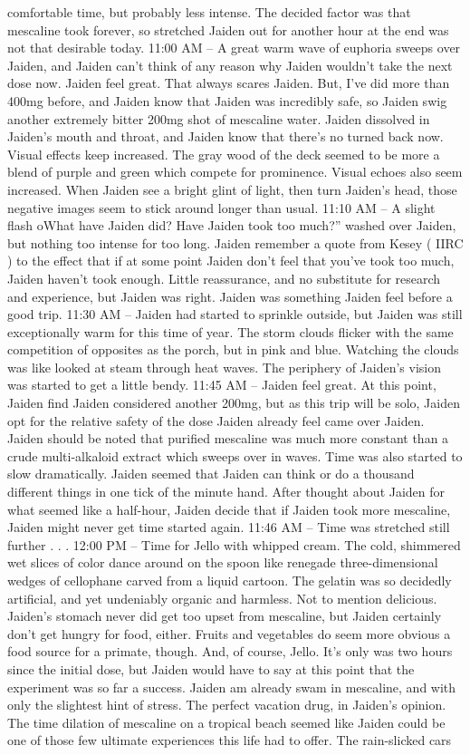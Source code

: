 \documentclass[12pt]{book}
\begin{document}
comfortable time, but probably less intense. The decided factor was that mescaline took forever, so stretched Jaiden out for another hour at the end was not that desirable today. 11:00 AM -- A great warm wave of euphoria sweeps over Jaiden, and Jaiden can't think of any reason why Jaiden wouldn't take the next dose now. Jaiden feel great. That always scares Jaiden. But, I've did more than 400mg before, and Jaiden know that Jaiden was incredibly safe, so Jaiden swig another extremely bitter 200mg shot of mescaline water. Jaiden dissolved in Jaiden's mouth and throat, and Jaiden know that there's no turned back now. Visual effects keep increased. The gray wood of the deck seemed to be more a blend of purple and green which compete for prominence. Visual echoes also seem increased. When Jaiden see a bright glint of light, then turn Jaiden's head, those negative images seem to stick around longer than usual. 11:10 AM -- A slight flash oWhat have Jaiden did? Have Jaiden took too much?'' washed over Jaiden, but nothing too intense for too long. Jaiden remember a quote from Kesey ( IIRC ) to the effect that if at some point Jaiden don't feel that you've took too much, Jaiden haven't took enough. Little reassurance, and no substitute for research and experience, but Jaiden was right. Jaiden was something Jaiden feel before a good trip. 11:30 AM -- Jaiden had started to sprinkle outside, but Jaiden was still exceptionally warm for this time of year. The storm clouds flicker with the same competition of opposites as the porch, but in pink and blue. Watching the clouds was like looked at steam through heat waves. The periphery of Jaiden's vision was started to get a little bendy. 11:45 AM -- Jaiden feel great. At this point, Jaiden find Jaiden considered another 200mg, but as this trip will be solo, Jaiden opt for the relative safety of the dose Jaiden already feel came over Jaiden. Jaiden should be noted that purified mescaline was much more constant than a crude multi-alkaloid extract which sweeps over in waves. Time was also started to slow dramatically. Jaiden seemed that Jaiden can think or do a thousand different things in one tick of the minute hand. After thought about Jaiden for what seemed like a half-hour, Jaiden decide that if Jaiden took more mescaline, Jaiden might never get time started again. 11:46 AM -- Time was stretched still further . . .  12:00 PM -- Time for Jello with whipped cream. The cold, shimmered wet slices of color dance around on the spoon like renegade three-dimensional wedges of cellophane carved from a liquid cartoon. The gelatin was so decidedly artificial, and yet undeniably organic and harmless. Not to mention delicious. Jaiden's stomach never did get too upset from mescaline, but Jaiden certainly don't get hungry for food, either. Fruits and vegetables do seem more obvious a food source for a primate, though. And, of course, Jello. It's only was two hours since the initial dose, but Jaiden would have to say at this point that the experiment was so far a success. Jaiden am already swam in mescaline, and with only the slightest hint of stress. The perfect vacation drug, in Jaiden's opinion. The time dilation of mescaline on a tropical beach seemed like Jaiden could be one of those few ultimate experiences this life had to offer. The rain-slicked cars 
\end{document}
